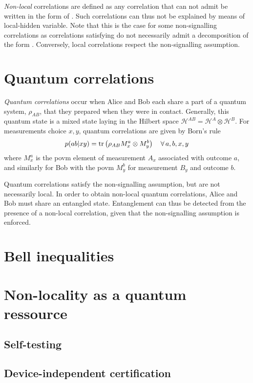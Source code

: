 \medbreak

\textit{Non-local} correlations are defined as any correlation that can not admit be written in the form of .
Such correlations can thus not be explained by means of local-hidden variable. 
Note that this is the case for some non-signalling correlations as correlations satisfying  do not necessarily admit a decomposition of the form .
Conversely, local correlations respect the non-signalling assumption.

\section{Quantum correlations}

\textit{Quantum correlations} occur when Alice and Bob each share a part of a quantum system, $\rho_{AB}$, that they prepared when they were in contact.
Generally, this quantum state is a mixed state laying in the Hilbert space $\mathscr{H}^{AB} = \mathscr{H}^{A} \otimes \mathscr{H}^B$.
For measurements choice $x,y$, quantum correlations are given by Born's rule
\begin{equation}
	p(ab|xy) = \trr{\rho_{AB} M^a_x \otimes M^b_y} \quad \forall\,a,b,x,y
	\label{eq:Born}
\end{equation}
where $M^a_x$ is the \acrfull{povm} element of measurement $A_x$ associated with outcome $a$, and similarly for Bob with the \acrshort{povm} $M^b_y$ for measurement $B_y$ and outcome $b$.

Quantum correlations satisfy the non-signalling assumption, but are not necessarily local.
In order to obtain non-local quantum correlations, Alice and Bob must share an entangled state.
Entanglement can thus be detected from the presence of a non-local correlation, given that the non-signalling assumption is enforced.

\section{Bell inequalities}

\section{Non-locality as a quantum ressource}

\subsection{Self-testing}
\subsection{Device-independent certification}


